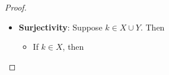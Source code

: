 \begin{proof}
\begin{itemize}
\begin{itemize}
\[\begin{array}{c}
                      \Downarrow                                                       \\
                      f(i) = f(j)                                                      \\
                      \by{\ensuremath{f: [1, n]_{\N} \xrightarrow{\sim} X}} \Downarrow \\
                      i = j
                    \end{array}
                  \]
            \item Otherwise,
                  \[
                    \begin{array}{c}
                      h(i) = g(i - n)                                                  \\
                      \Downarrow                                                       \\
                      g(i - n) = h(j) \in Y                                            \\
                      \by{\ensuremath{X \cap Y = \vnot}} \Downarrow                    \\
                      j > n                                                            \\
                      \Downarrow                                                       \\
                      h(j) = g(j - n)                                                  \\
                      \Downarrow                                                       \\
                      g(i - n) = g(j - n)                                              \\
                      \by{\ensuremath{g: [1, m]_{\N} \xrightarrow{\sim} Y}} \Downarrow \\
                      i - n = j - n                                                    \\
                      \Downarrow                                                       \\
                      i = j
                    \end{array}
                  \]
          \end{itemize}
    \item \textbf{Surjectivity}: Suppose $k \in X \cup Y$. Then
          \begin{itemize}
            \item If $k \in X$, then

\end{itemize}
\end{itemize}
\end{proof}
